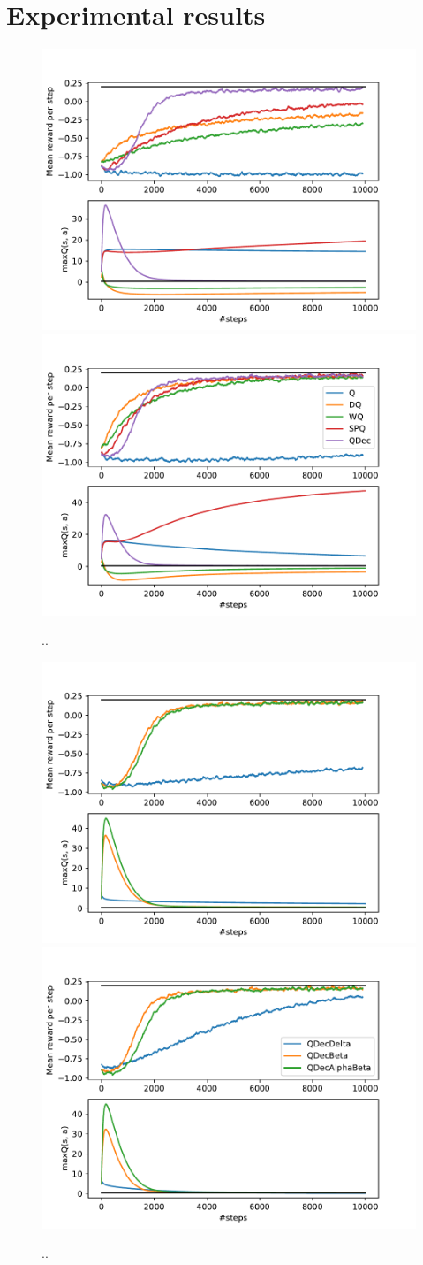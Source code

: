 \documentclass[conference]{IEEEtran}
\begin{document}
\section{Experimental results}
\begin{figure}[t]
 \begin{minipage}{\textwidth}
 \centering
  \includegraphics[width=.475\textwidth]{./imgs/gridHasselt/allAlgs1.pdf}
  \includegraphics[width=.475\textwidth]{./imgs/gridHasselt/allAlgs08.pdf}\\
 \end{minipage}
  \caption{..}
  \label{F:hasselt_all}
\end{figure}
\begin{figure}[t]
 \begin{minipage}{\textwidth}
 \centering
  \includegraphics[width=.475\textwidth]{./imgs/gridHasselt/QDecs1.pdf}
  \includegraphics[width=.475\textwidth]{./imgs/gridHasselt/QDecs08.pdf}\\
 \end{minipage}
  \caption{..}
  \label{F:hasselt_all}
\end{figure}
\end{document}
